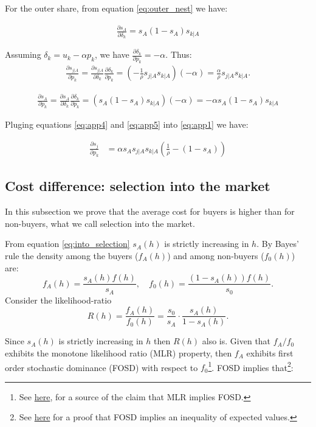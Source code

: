 \documentclass[12pt]{article}
\theoremstyle{plain}
\theoremstyle{plain}
\begin{document}
For the outer share, from equation \ref{eq:outer_nest} we have: 

\begin{align}
    \frac{\partial s_A}{\partial\delta_k} = s_A(1-s_A)s_{k|A}
\end{align}

Assuming $\delta_k = u_k - \alpha p_k$, we have $\frac{\partial\delta_k}{\partial p_k} = -\alpha$. Thus: 
\begin{align}\label{eq:app4}
    \frac{\partial s_{j|A}}{\partial p_k} = \frac{\partial s_{j|A}}{\partial \delta_k}\frac{\partial \delta_k}{\partial p_k} = \left(-\frac{1}{\rho}s_{j|A}s_{k|A}\right)(-\alpha) = \frac{\alpha}{\rho}s_{j|A}s_{k|A}.
\end{align}

\begin{align}\label{eq:app5}
    \frac{\partial s_A}{\partial p_k} = \frac{\partial s_A}{\partial \delta_k}\frac{\partial \delta_k}{\partial p_k} = (s_A(1-s_A)s_{k|A})(-\alpha) = -\alpha s_A(1-s_A)s_{k|A}    
\end{align}

Pluging equations \ref{eq:app4} and \ref{eq:app5} into \ref{eq:app1} we have: 


\begin{align}\label{eq:app6}
    \frac{\partial s_j}{\partial p_k} 
    &= \alpha s_A s_{j|A}s_{k|A}\left(\frac{1}{\rho}  - (1-s_A)\right)
\end{align}


\bigskip

\subsection{Cost difference: selection into the market}\label{sec:appendix2}
In this subsection we prove that the average cost for buyers is higher than for non-buyers, what we call selection into the market. 

From equation \ref{eq:into_selection} 
$s_A(h)$ is strictly increasing in $h$.  By Bayes' rule the density among the buyers ($f_A(h)$) and among non-buyers ($f_0(h)$) are: 
    $$f_A(h) = \frac{s_A(h)f(h)}{s_A}, \quad f_0(h) = \frac{(1-s_A(h))f(h)}{s_0}.$$
Consider the likelihood-ratio
    $$R(h) = \frac{f_A(h)}{f_0(h)} = \frac{s_0}{s_A} \cdot \frac{s_A(h)}{1-s_A(h)}.$$

Since $s_A(h)$ is strictly increasing in $h$ then $R(h)$ also is. 
Given that $f_A/f_0$ exhibits the monotone likelihood ratio (MLR) property, then $f_A$ exhibits first order stochastic dominance (FOSD) with respect to $f_0$\footnote{See  \href{https://en.wikipedia.org/wiki/Monotone_likelihood_ratio?utm_source=chatgpt.com}{here}, for a source of the claim that MLR implies FOSD.}. FOSD implies that\footnote{See \href{https://economics.stackexchange.com/questions/15134/implication-of-first-order-stochastic-dominance?utm_source=chatgpt.com}{here} for a proof that FOSD implies an inequality of expected values. }: 
\end{document}
